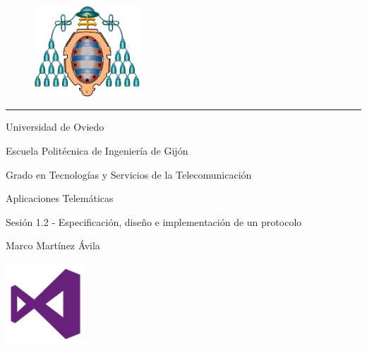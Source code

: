 \documentclass[a4paper,openright,10pt]{article}
\begin{document}
\pagestyle{empty} %
\begin{center}
\vspace*{-1.5cm}
\begin{figure}
\centering
\includegraphics[width=4cm]{uniovi.png}
\end{figure}
\vspace*{0.5cm}
\rule{80mm}{0.1mm}

\begin{Large}

Universidad de Oviedo
	
\end{Large}

Escuela Politécnica de Ingeniería de Gijón

\vspace*{3cm}

\begin{Large}

Grado en Tecnologías y Servicios de la Telecomunicación
	
\end{Large}

\vspace*{0.17cm}

Aplicaciones Telemáticas

\vspace*{1cm}

\begin{huge}

Sesión 1.2 - Especificación, diseño e implementación de un protocolo

\end{huge}

\vspace*{0.5cm}

Marco Martínez Ávila
	
\end{center}

\begin{center}
	
\vspace*{2cm}
\centering
\includegraphics[width=3cm]{logo.png}
	
	
\end{center}
\end{document}
